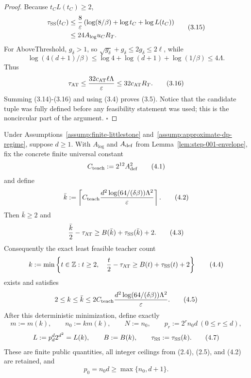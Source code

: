 \begin{proof}
Because \(t_CL(t_C)\ge2\),
\[
\begin{aligned}
\tau_{\rm SS}(t_C)
&\le\frac8\varepsilon
 \left(\log(8/\beta)+\log t_C+\log L(t_C)\right)\\
&\le24A_{\log}u_CR_T.
\end{aligned}
\tag{3.15}
\]
For AboveThreshold, \(g_\delta>1\), so
\(\sqrt{g_\delta}+g_\delta\le2g_\delta\le2\ell\), while
\[
\log(4(d+1)/\beta)
\le\log4+\log(d+1)+\log(1/\beta)\le4\Lambda.
\]
Thus
\[
\tau_{\rm AT}
\le\frac{32c_{\rm AT}\ell\Lambda}{\varepsilon}
\le32c_{\rm AT}R_T.
\tag{3.16}
\]
Summing (3.14)-(3.16) and using (3.4) proves (3.5). Notice that the
candidate tuple was fully defined before any feasibility statement was
used; this is the noncircular part of the argument. \(\square\)


\end{proof}

\begin{proposition}\label{prop:step-001-teacher}
Under Assumptions~\ref{assump:finite-littlestone}
and~\ref{assump:approximate-dp-regime}, suppose \(d\ge1\). With
\(A_{\log}\) and \(A_{\rm def}\) from
Lemma~\ref{lem:step-001-envelope}, fix the concrete finite universal
constant
\[
C_{\rm teach}:=2^{12}A_{\rm def}^2
\tag{4.1}
\]
and define
\[
\bar k:=\left\lceil
C_{\rm teach}
\frac{d^2\log(64/(\delta\beta))\Lambda^2}{\varepsilon}
\right\rceil.
\tag{4.2}
\]
Then \(\bar k\ge2\) and
\[
\frac{\bar k}{2}-\tau_{\rm AT}
\ge B(\bar k)+\tau_{\rm SS}(\bar k)+2.
\tag{4.3}
\]
Consequently the exact least feasible teacher count
\[
k:=\min\left\{t\in\mathbb Z:t\ge2,\quad
\frac t2-\tau_{\rm AT}
\ge B(t)+\tau_{\rm SS}(t)+2\right\}
\tag{4.4}
\]
exists and satisfies
\[
2\le k\le\bar k
\le2C_{\rm teach}
\frac{d^2\log(64/(\delta\beta))\Lambda^2}{\varepsilon}.
\tag{4.5}
\]
After this deterministic minimization, define exactly
\[
m:=m(k),\qquad n_0:=km(k),\qquad N:=n_0,
\qquad p_r:=2^rn_0d\ (0\le r\le d),
\tag{4.6}
\]
\[
L:=p_d^d2^{d^2}=L(k),\qquad B:=B(k),
\qquad \tau_{\rm SS}:=\tau_{\rm SS}(k).
\tag{4.7}
\]
These are finite public quantities, all integer ceilings from (2.4), (2.5),
and (4.2) are retained, and
\[
p_0=n_0d\ge\max\{n_0,d+1\}.
\tag{4.8}
\]


\end{proposition}

